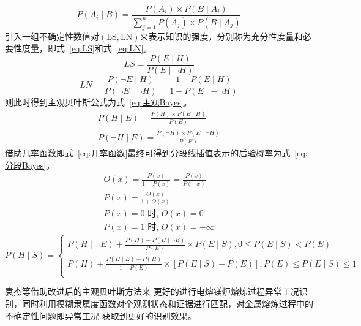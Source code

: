 \documentclass[12pt,a4paper,UTF8]{ctexart}
\begin{document}
\begin{equation}
    \label{eq:全概率Bayes}
    P\left(A_i \mid B\right)=\frac{P\left(A_i\right) \times P\left(B \mid A_i\right)}{\sum_{j=1}^n P\left(A_j\right) \times P\left(B \mid A_j\right)}
    \end{equation}
引入一组不确定性数值对$ (\mathrm{LS}, \mathrm{LN}) $来表示知识的强度，分别称为充分性度量和必要性度量，即式~\ref{eq:LS}和式~\ref{eq:LN}。
\begin{equation}
    \label{eq:LS}
    L S=\frac{P(E \mid H)}{P(E \mid \neg H)}
\end{equation}
\begin{equation}
    \label{eq:LN}
    L N=\frac{P(\neg E \mid H)}{P(\neg E \mid \neg H)}=\frac{1-P(E \mid H)}{1-P(E \mid-\neg H)}
\end{equation}
则此时得到主观贝叶斯公式为式~\ref{eq:主观Bayes}。
\begin{equation}
    \label{eq:主观Bayes}
    \begin{gathered}
    P(H \mid E)=\frac{P(H) \times P(E \mid H)}{P(E)} \\
    P(\neg H \mid E)=\frac{P(\neg H) \times P(E \mid \neg H)}{P(E)}
    \end{gathered}
\end{equation}
借助几率函数即式~\ref{eq:几率函数}最终可得到分段线插值表示的后验概率为式~\ref{eq:分段Bayes}。
\begin{equation}
    \label{eq:几率函数}
    \begin{gathered}
    O(x)=\frac{P(x)}{1-P(x)}=\frac{P(x)}{P(-x)} \\
    P(x)=\frac{O(x)}{1+O(x)} \\
    P(x)=0 \text { 时, } O(x)=0 \\
    P(x)=1 \text { 时, } O(x)=+\infty
    \end{gathered}
\end{equation}
\begin{equation}
    \label{eq:分段Bayes}
    P(H \mid S)=\left\{\begin{array}{c}
    P(H \mid \neg E)+\frac{P(H)-P(H \mid \neg E)}{P(E)} \times P(E \mid S), 0 \leq P(E \mid S)<P(E) \\
    P(H)+\frac{P(H \mid E)-P(H)}{1-P(E)} \times[P(E \mid S)-P(E)], P(E) \leq P(E \mid S) \leq 1 \\
    \end{array}\right.
\end{equation}

袁杰等\cite{YuanJiYuGaiJinZhuGuanBeiYeSiFangFaShiBieDianRongMeiLuYiChangGongKuang2021}借助改进后的主观贝叶斯方法来
更好的进行电熔镁炉熔炼过程异常工况识别，同时利用模糊隶属度函数对个观测状态和证据进行匹配，对金属熔炼过程中的不确定性问题即异常工况
获取到更好的识别效果。



























\end{document}
